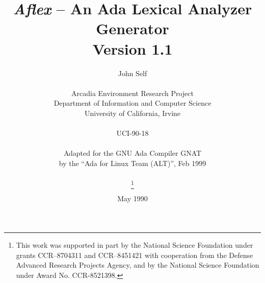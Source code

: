 \addtolength{\oddsidemargin}{0in}
\addtolength{\textwidth}{+0.5in}
\addtolength{\topmargin}{-0.5in}       %
\addtolength{\textheight}{0.5in}
\renewcommand{\topfraction}{0.95}
\renewcommand{\textfraction}{0.05}  %
\parindent 0pt


\newcommand{\mysk}{\vspace{0.5cm}}

\title{\vspace{2cm}\goodbreak 
\bf {\sl Aflex} \rm -- An Ada Lexical Analyzer Generator
\\ \vspace{1cm} Version 1.1 \vspace{1cm}
}
\author{\large \rm John Self \\
\ \\
Arcadia Environment Research Project \\
Department of Information and Computer Science\\
University of California, Irvine \\
\\UCI-90-18\\
\medskip\\
Adapted for the GNU Ada Compiler GNAT\\
by the ``Ada for Linux Team (ALT)'', Feb 1999\\
\\
\thanks{This work was supported in
part by the National Science Foundation under grants CCR--8704311
and CCR--8451421 with cooperation from the Defense Advanced Research
Projects Agency, and by the National Science Foundation under Award
No. CCR-8521398.}
}

\date{May 1990}



\maketitle

\begin{titlepage}
\tableofcontents
\end{titlepage}

